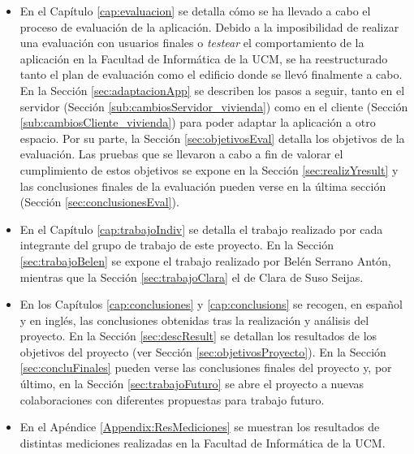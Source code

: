 \begin{itemize}
	\item En el Capítulo \ref{cap:evaluacion} se detalla cómo se ha llevado a cabo el proceso de evaluación de la aplicación. Debido a la imposibilidad de realizar una evaluación con usuarios finales o \textit{testear} el comportamiento de la aplicación en la Facultad de Informática de la UCM, se ha reestructurado tanto el plan de evaluación como el edificio donde se llevó finalmente a cabo. En la Sección \ref{sec:adaptacionApp} se describen los pasos a seguir, tanto en el servidor (Sección \ref{sub:cambiosServidor_vivienda}) como en el cliente (Sección \ref{sub:cambiosCliente_vivienda}) para poder adaptar la aplicación a otro espacio. Por su parte, la Sección \ref{sec:objetivosEval} detalla los objetivos de la evaluación. Las pruebas que se llevaron a cabo a fin de valorar el cumplimiento de estos objetivos se expone en la Sección \ref{sec:realizYresult} y las conclusiones finales de la evaluación pueden verse en la última sección (Sección \ref{sec:conclusionesEval}).
	
	\item En el Capítulo \ref{cap:trabajoIndiv} se detalla el trabajo realizado por cada integrante del grupo de trabajo de este proyecto. En la Sección \ref{sec:trabajoBelen} se expone el trabajo realizado por Belén Serrano Antón, mientras que la Sección \ref{sec:trabajoClara} el de Clara de Suso Seijas.
	
	\item En los Capítulos \ref{cap:conclusiones} y \ref{cap:conclusions} se recogen, en español y en inglés, las conclusiones obtenidas tras la realización y análisis del proyecto. En la Sección \ref{sec:descResult} se detallan los resultados de los objetivos del proyecto (ver Sección \ref{sec:objetivosProyecto}). En la Sección \ref{sec:concluFinales} pueden verse las conclusiones finales del proyecto y, por último, en la Sección \ref{sec:trabajoFuturo} se abre el proyecto a nuevas colaboraciones con diferentes propuestas para trabajo futuro.
	
	\item En el Apéndice \ref{Appendix:ResMediciones} se muestran los resultados de distintas mediciones realizadas en la Facultad de Informática de la UCM.
	
\end{itemize}
